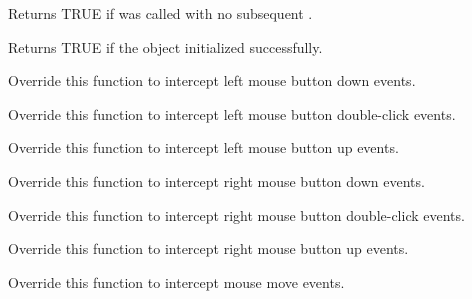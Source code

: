 
Returns TRUE if  was called with no subsequent .

\label{wxtaskbariconisok}


Returns TRUE if the object initialized successfully.

\label{wxtaskbaricononlbuttondown}


Override this function to intercept left mouse button down events.

\label{wxtaskbaricononlbuttondclick}


Override this function to intercept left mouse button double-click events.

\label{wxtaskbaricononlbuttonup}


Override this function to intercept left mouse button up events.

\label{wxtaskbaricononrbuttondown}


Override this function to intercept right mouse button down events.

\label{wxtaskbaricononrbuttondclick}


Override this function to intercept right mouse button double-click events.

\label{wxtaskbaricononrbuttonup}


Override this function to intercept right mouse button up events.

\label{wxtaskbaricononmousemove}


Override this function to intercept mouse move events.

